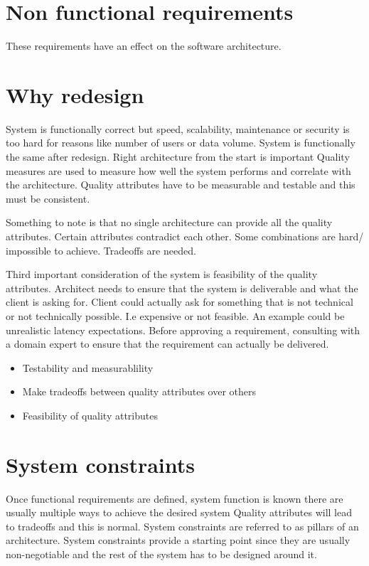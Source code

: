 \documentclass[a4paper, 11pt]{book}
\begin{document}
    \section{Non functional requirements}
    These requirements have an effect on the software architecture.

    \section{Why redesign}
    System is functionally correct but speed, scalability, maintenance or security is too hard for reasons like number of users or data volume.
    System is functionally the same after redesign.
    Right architecture from the start is important
    Quality measures are used to measure how well the system performs and correlate with the architecture.
    Quality attributes have to be measurable and testable and this must be consistent.

    Something to note is that no single architecture can provide all the quality attributes. Certain attributes contradict each other.
    Some combinations are hard/ impossible to achieve.
    Tradeoffs are needed.

    Third important consideration of the system is feasibility of the quality attributes.
    Architect needs to ensure that the system is deliverable and what the client is asking for.
    Client could actually ask for something that is not technical or not technically possible.
    I.e expensive or not feasible.
    An example could be unrealistic latency expectations.
    Before approving a requirement, consulting with a domain expert to ensure that the requirement can actually be delivered.

    \begin{itemize}
        \item Testability and measurablility
        \item Make tradeoffs between quality attributes over others
        \item Feasibility of quality attributes
    \end{itemize}

    \section{System constraints}
    Once functional requirements are defined, system function is known there are usually multiple ways to achieve the desired system
    Quality attributes will lead to tradeoffs and this is normal.
    System constraints are referred to as pillars of an architecture.
    System constraints provide a starting point since they are usually non-negotiable and the rest of the system has to be designed around it.
\end{document}
